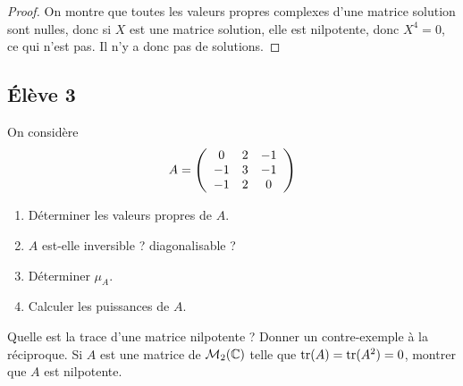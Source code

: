 \documentclass[10pt]{scrartcl}
\begin{document}
    \begin{proof}
        On montre que toutes les valeurs propres complexes d'une matrice solution
        sont nulles, donc si $X$ est une matrice solution, elle est nilpotente, donc 
        $X^4=0$, ce qui n'est pas. 
        Il n'y a donc pas de solutions.
    \end{proof}

    \subsection*{Élève 3}
    \begin{ccp}
        On considère 
        \[
            A=\left(\begin{array}{c c c}
                0 & 2 & -1\\
                -1 & 3 & -1\\
                -1 & 2 & 0
            \end{array}\right)
        \]
        \begin{enumerate}
            \item Déterminer les valeurs propres de $A$. 
            \item $A$ est-elle inversible ? diagonalisable ?
            \item Déterminer $\mu_A$.
            \item Calculer les puissances de $A$.
        \end{enumerate}
    \end{ccp}

    \begin{exo}
        Quelle est la trace d'une matrice nilpotente ? 
        Donner un contre-exemple à la réciproque. 
        Si $A$ est une matrice de $\mathcal M_2(\operatorname{\mathbb C})$ 
        telle que $\operatorname{tr}(A)=\operatorname{tr}(A^2)=0$, montrer que $A$ 
        est nilpotente.
    \end{exo}
\end{document}
